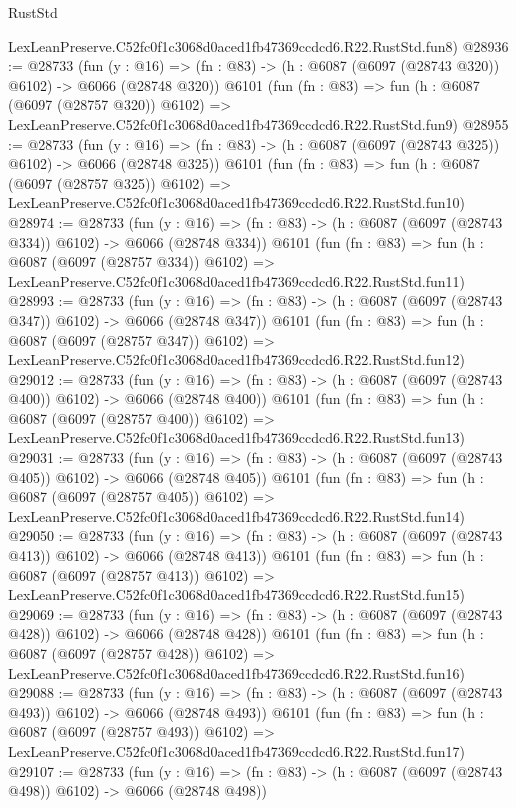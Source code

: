 \begin{lexlean}{RustStd}
\begin{coremodule}
    LexLeanPreserve.C52fc0f1c3068d0aced1fb47369ccdcd6.R22.RustStd.fun8)
@28936 := @28733
    (fun (y : @16) => (fn : @83) -> (h : @6087 (@6097 (@28743 @320)) @6102) -> @6066 (@28748 @320))
    @6101
    (fun (fn : @83) =>
    fun (h : @6087 (@6097 (@28757 @320)) @6102) =>
    LexLeanPreserve.C52fc0f1c3068d0aced1fb47369ccdcd6.R22.RustStd.fun9)
@28955 := @28733
    (fun (y : @16) => (fn : @83) -> (h : @6087 (@6097 (@28743 @325)) @6102) -> @6066 (@28748 @325))
    @6101
    (fun (fn : @83) =>
    fun (h : @6087 (@6097 (@28757 @325)) @6102) =>
    LexLeanPreserve.C52fc0f1c3068d0aced1fb47369ccdcd6.R22.RustStd.fun10)
@28974 := @28733
    (fun (y : @16) => (fn : @83) -> (h : @6087 (@6097 (@28743 @334)) @6102) -> @6066 (@28748 @334))
    @6101
    (fun (fn : @83) =>
    fun (h : @6087 (@6097 (@28757 @334)) @6102) =>
    LexLeanPreserve.C52fc0f1c3068d0aced1fb47369ccdcd6.R22.RustStd.fun11)
@28993 := @28733
    (fun (y : @16) => (fn : @83) -> (h : @6087 (@6097 (@28743 @347)) @6102) -> @6066 (@28748 @347))
    @6101
    (fun (fn : @83) =>
    fun (h : @6087 (@6097 (@28757 @347)) @6102) =>
    LexLeanPreserve.C52fc0f1c3068d0aced1fb47369ccdcd6.R22.RustStd.fun12)
@29012 := @28733
    (fun (y : @16) => (fn : @83) -> (h : @6087 (@6097 (@28743 @400)) @6102) -> @6066 (@28748 @400))
    @6101
    (fun (fn : @83) =>
    fun (h : @6087 (@6097 (@28757 @400)) @6102) =>
    LexLeanPreserve.C52fc0f1c3068d0aced1fb47369ccdcd6.R22.RustStd.fun13)
@29031 := @28733
    (fun (y : @16) => (fn : @83) -> (h : @6087 (@6097 (@28743 @405)) @6102) -> @6066 (@28748 @405))
    @6101
    (fun (fn : @83) =>
    fun (h : @6087 (@6097 (@28757 @405)) @6102) =>
    LexLeanPreserve.C52fc0f1c3068d0aced1fb47369ccdcd6.R22.RustStd.fun14)
@29050 := @28733
    (fun (y : @16) => (fn : @83) -> (h : @6087 (@6097 (@28743 @413)) @6102) -> @6066 (@28748 @413))
    @6101
    (fun (fn : @83) =>
    fun (h : @6087 (@6097 (@28757 @413)) @6102) =>
    LexLeanPreserve.C52fc0f1c3068d0aced1fb47369ccdcd6.R22.RustStd.fun15)
@29069 := @28733
    (fun (y : @16) => (fn : @83) -> (h : @6087 (@6097 (@28743 @428)) @6102) -> @6066 (@28748 @428))
    @6101
    (fun (fn : @83) =>
    fun (h : @6087 (@6097 (@28757 @428)) @6102) =>
    LexLeanPreserve.C52fc0f1c3068d0aced1fb47369ccdcd6.R22.RustStd.fun16)
@29088 := @28733
    (fun (y : @16) => (fn : @83) -> (h : @6087 (@6097 (@28743 @493)) @6102) -> @6066 (@28748 @493))
    @6101
    (fun (fn : @83) =>
    fun (h : @6087 (@6097 (@28757 @493)) @6102) =>
    LexLeanPreserve.C52fc0f1c3068d0aced1fb47369ccdcd6.R22.RustStd.fun17)
@29107 := @28733
    (fun (y : @16) => (fn : @83) -> (h : @6087 (@6097 (@28743 @498)) @6102) -> @6066 (@28748 @498))

\end{coremodule}
\end{lexlean}

